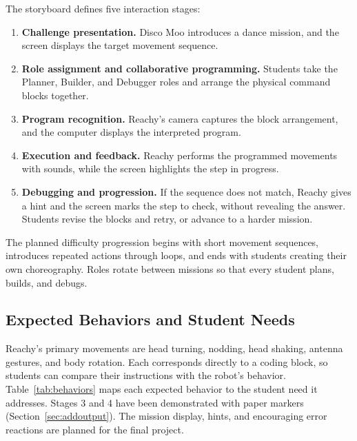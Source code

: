 \documentclass[conference]{IEEEtran}
\begin{document}
The storyboard defines five interaction stages:
\begin{enumerate}
    \item \textbf{Challenge presentation.} Disco Moo introduces a dance mission, and the screen displays the target movement sequence.
    \item \textbf{Role assignment and collaborative programming.} Students take the Planner, Builder, and Debugger roles and arrange the physical command blocks together.
    \item \textbf{Program recognition.} Reachy's camera captures the block arrangement, and the computer displays the interpreted program.
    \item \textbf{Execution and feedback.} Reachy performs the programmed movements with sounds, while the screen highlights the step in progress.
    \item \textbf{Debugging and progression.} If the sequence does not match, Reachy gives a hint and the screen marks the step to check, without revealing the answer. Students revise the blocks and retry, or advance to a harder mission.
\end{enumerate}

The planned difficulty progression begins with short movement sequences, introduces repeated actions through loops, and ends with students creating their own choreography. Roles rotate between missions so that every student plans, builds, and debugs.

\subsection{Expected Behaviors and Student Needs}
\label{sec:behaviors}

Reachy's primary movements are head turning, nodding, head shaking, antenna gestures, and body rotation. Each corresponds directly to a coding block, so students can compare their instructions with the robot's behavior. Table~\ref{tab:behaviors} maps each expected behavior to the student need it addresses. Stages 3 and 4 have been demonstrated with paper markers (Section~\ref{sec:addoutput}). The mission display, hints, and encouraging error reactions are planned for the final project.
\end{document}
